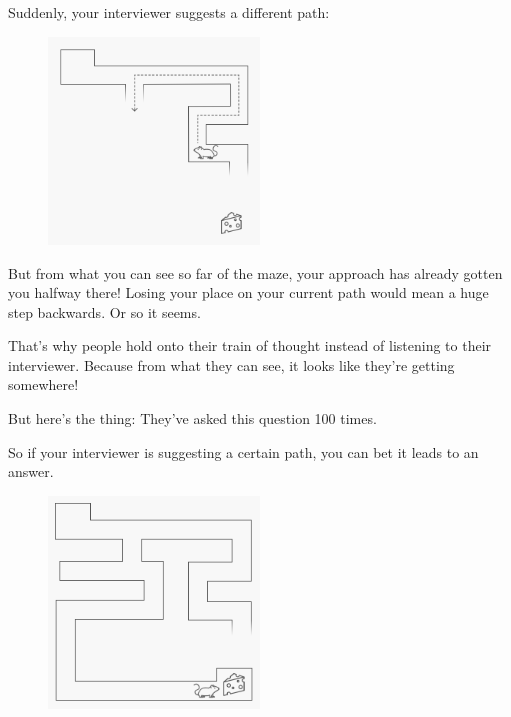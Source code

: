 \documentclass{article}
\begin{document}
Suddenly, your interviewer suggests a different path: 


\begin{figure}[H]
  \centering
  \includegraphics[width=0.5\textwidth]{pics/maze3}
  \label{fig:maze3}
\end{figure}


But from what you can see so far of the maze, your approach has already gotten you halfway there! Losing your place on your current path would mean a huge step backwards. Or so it seems.

That's why people hold onto their train of thought instead of listening to their interviewer. Because from what they can see, it looks like they're getting somewhere!

But here's the thing:  They've asked this question 100 times.


So if your interviewer is suggesting a certain path, you can bet it leads to an answer. 

\begin{figure}[H]
  \centering
  \includegraphics[width=0.5\textwidth]{pics/maze4}
  \label{fig:maze4}
\end{figure}
\end{document}
